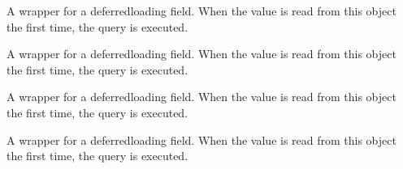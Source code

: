 \documentclass[a4paper,11pt,spanish]{sphinxmanual}
\begin{document}
\begin{fulllineitems}

\begin{fulllineitems}
\label{\detokenize{api/CashRegister/CashRegister.models:CashRegister.models.CashSession.closed_at}}
\pysigstartsignatures
\pysigline
{}
\pysigstopsignatures
\sphinxAtStartPar
A wrapper for a deferred\sphinxhyphen{}loading field. When the value is read from this
object the first time, the query is executed.

\end{fulllineitems}


\begin{fulllineitems}
\label{\detokenize{api/CashRegister/CashRegister.models:CashRegister.models.CashSession.counted_cash}}
\pysigstartsignatures
\pysigline
{}
\pysigstopsignatures
\sphinxAtStartPar
A wrapper for a deferred\sphinxhyphen{}loading field. When the value is read from this
object the first time, the query is executed.

\end{fulllineitems}


\begin{fulllineitems}
\label{\detokenize{api/CashRegister/CashRegister.models:CashRegister.models.CashSession.date}}
\pysigstartsignatures
\pysigline
{}
\pysigstopsignatures
\sphinxAtStartPar
A wrapper for a deferred\sphinxhyphen{}loading field. When the value is read from this
object the first time, the query is executed.

\end{fulllineitems}


\begin{fulllineitems}
\label{\detokenize{api/CashRegister/CashRegister.models:CashRegister.models.CashSession.difference}}
\pysigstartsignatures
\pysigline
{}
\pysigstopsignatures
\sphinxAtStartPar
A wrapper for a deferred\sphinxhyphen{}loading field. When the value is read from this
object the first time, the query is executed.


\end{fulllineitems}
\end{fulllineitems}
\end{document}
